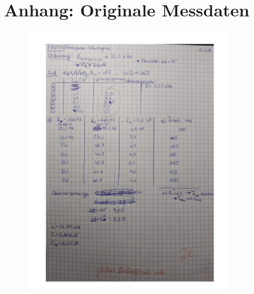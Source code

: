 \section{Anhang: Originale Messdaten}
\label{sec:Anhang}

\begin{figure}
    \centering
    \includegraphics[width=0.8\textwidth]{plots/fkhds.pdf}
    \label{fig:anhang}
\end{figure}